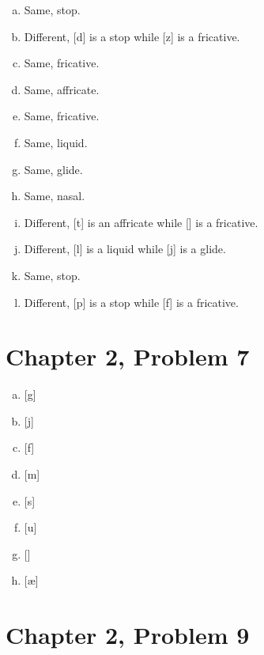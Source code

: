 \documentclass[12pt]{article}
\begin{document}
\begin{multicols}{2}
    \begin{enumerate}[a)]
        \item Same, stop.
        \item Different, [d] is a stop while [z] is a fricative.
        \item Same, fricative.
        \item Same, affricate.
        \item Same, fricative.
        \item Same, liquid.
        \item Same, glide.
        \item Same, nasal.
        \item Different, [t\textesh] is an affricate while [\textesh] is a fricative.
        \item Different, [l] is a liquid while [j] is a glide.
        \item Same, stop.
        \item Different, [p] is a stop while [f] is a fricative.
    \end{enumerate}
\end{multicols}

\section*{Chapter 2, Problem 7}

\begin{multicols}{2}
    \begin{enumerate}[a)]
        \item {[g]}
        \item {[j]}
        \item {[f]}
        \item {[m]}
        \item {[s]}
        \item {[u]}
        \item {[\dh]}
        \item {[\ae]}
    \end{enumerate}
\end{multicols}

\section*{Chapter 2, Problem 9}
\end{document}
